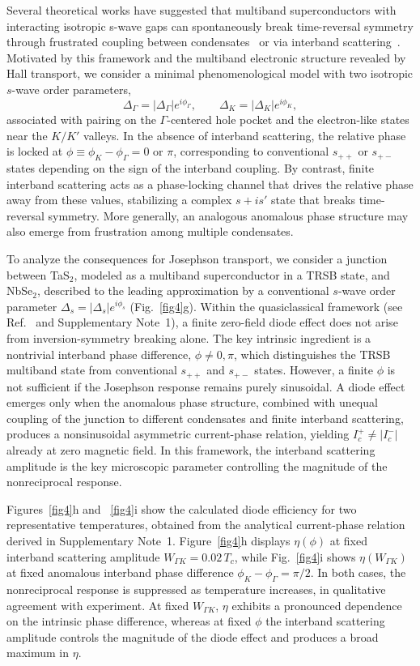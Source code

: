 \documentclass[twocolumn,secnumarabic,amssymb, nobibnotes, aps, prl, superscriptaddress]{revtex4-2}
\begin{document}
Several theoretical works have suggested that multiband superconductors with interacting isotropic s-wave gaps can spontaneously break time-reversal symmetry through frustrated coupling between condensates~\cite{sta10,oiw19,yer24, yerin2014, yerin2015} or via interband scattering~\cite{yer24}. Motivated by this framework and the multiband electronic structure revealed by Hall transport, we consider a minimal phenomenological model  with two isotropic $s$-wave order parameters,
\[
\Delta_{\Gamma}=|\Delta_{\Gamma}|e^{i\phi_{\Gamma}}, \qquad
\Delta_{K}=|\Delta_{K}|e^{i\phi_{K}},
\]
associated with pairing on the $\Gamma$-centered hole pocket and the electron-like states near the $K/K'$ valleys. 
In the absence of interband scattering, the relative phase is locked at $\phi\equiv\phi_{K}-\phi_{\Gamma}=0$ or $\pi$, corresponding to conventional $s_{++}$ or $s_{+-}$ states depending on the sign of the interband coupling.   
By contrast, finite interband scattering acts as a phase-locking channel that drives the relative phase away from these values, stabilizing a complex $s+is'$ state that breaks time-reversal symmetry. More generally, an analogous anomalous phase structure may also emerge from frustration among multiple condensates.

To analyze the consequences for Josephson transport, we consider a junction between TaS$_2$, modeled as a multiband superconductor in a TRSB state, and NbSe$_2$, described to the leading approximation by a conventional $s$-wave order parameter $\Delta_s=|\Delta_s|e^{i\phi_s}$ (Fig.~\ref{fig4}g). Within the quasiclassical framework (see Ref.~\cite{yer24} and Supplementary Note~1), a finite zero-field diode effect does not arise from inversion-symmetry breaking alone. The key intrinsic ingredient is a nontrivial interband phase difference, $\phi\neq 0,\pi$, which distinguishes the TRSB multiband state from conventional $s_{++}$ and $s_{+-}$ states. However, a finite $\phi$ is not sufficient if the Josephson response remains purely sinusoidal. A diode effect emerges only when the anomalous phase structure, combined with unequal coupling of the junction to different condensates and finite interband scattering, produces a nonsinusoidal asymmetric current-phase relation, yielding $I_c^{+}\neq |I_c^{-}|$ already at zero magnetic field. In this framework, the interband scattering amplitude is the key microscopic parameter controlling the magnitude of the nonreciprocal response.

Figures~\ref{fig4}h and ~\ref{fig4}i show the calculated diode efficiency for two representative temperatures, obtained from the analytical current-phase relation derived in Supplementary Note~1. Figure~\ref{fig4}h displays $\eta(\phi)$ at fixed interband scattering amplitude $W_{\Gamma K}=0.02\,T_c$, while Fig.~\ref{fig4}i shows $\eta(W_{\Gamma K})$ at fixed anomalous interband phase difference $\phi_K-\phi_{\Gamma}=\pi/2$. In both cases, the nonreciprocal response is suppressed as temperature increases, in qualitative agreement with experiment. At fixed $W_{\Gamma K}$, $\eta$ exhibits a pronounced dependence on the intrinsic phase difference, whereas at fixed $\phi$ the interband scattering amplitude controls the magnitude of the diode effect and produces a broad maximum in $\eta$. 
\end{document}
